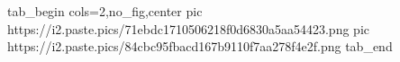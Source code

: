  
 
 
 
 
\qqSecCmtScr

\ifcmt
  tab_begin cols=2,no_fig,center
     pic https://i2.paste.pics/71ebdc1710506218f0d6830a5aa54423.png
		 pic https://i2.paste.pics/84cbc95fbacd167b9110f7aa278f4e2f.png
  tab_end
\fi
